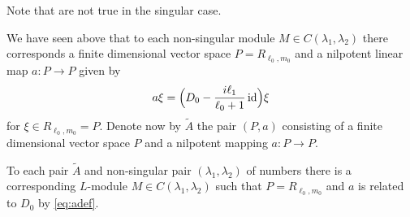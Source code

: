 \begin{remark}
  Note that  are not true in the singular case.
\end{remark}

We have seen above that to each non-singular module $M\in C(\lambda_1,\lambda_2)$ there corresponds a finite dimensional vector space $P=R_{\ell_0,m_0}$ and a nilpotent linear map $a\colon P\to P$ given by
\begin{align*}
  a\xi = \Bigl( D_0 - \dfrac{i\ell_1}{\ell_0+1}\operatorname{id}\Bigr) \xi
\end{align*}
for $\xi\in R_{\ell_0,m_0}=P$. Denote now by $\widetilde{A}$ the pair $(P,a)$ consisting of a finite dimensional vector space $P$ and a nilpotent mapping $a\colon P\to P$.

\begin{theorem}\label{thm:objectscor}
  To each pair $\widetilde{A}$ and non-singular pair $(\lambda_1,\lambda_2)$ of numbers there is a corresponding $L$-module $M\in C(\lambda_1,\lambda_2)$ such that $P=R_{\ell_0,m_0}$ and $a$ is related to $D_0$ by \cref{eq:adef}.
\end{theorem}

